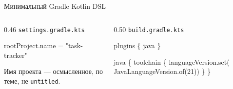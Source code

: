 \begin{frame}[fragile]{Минимальный Gradle Kotlin DSL}
  \vspace{0.1em}
  \begin{columns}[T]
    \begin{column}{0.46\textwidth}
      {\footnotesize\texttt{settings.gradle.kts}}
      \begin{semiverbatim}
rootProject.name = "task-tracker"
      \end{semiverbatim}
      \vspace{0.6em}
      {\footnotesize\color{acGray}
      Имя проекта --- осмысленное, по теме, не \texttt{untitled}.}
    \end{column}
    \begin{column}{0.50\textwidth}
      {\footnotesize\texttt{build.gradle.kts}}
      \footnotesize
      \begin{semiverbatim}
plugins \{
    java
\}

java \{
    toolchain \{
        languageVersion.set(
            JavaLanguageVersion.of(21))
    \}
\}
      \end{semiverbatim}
    \end{column}
  \end{columns}
\end{frame}
